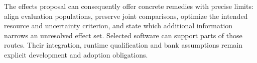 The effects proposal can consequently offer concrete remedies with precise
limits: align evaluation populations, preserve joint comparisons, optimize
the intended resource and uncertainty criterion, and state which additional
information narrows an unresolved effect set. Selected software can support
parts of those routes. Their integration, runtime qualification and bank
assumptions remain explicit development and adoption obligations.
\label{exec17:s4-extension-end}
